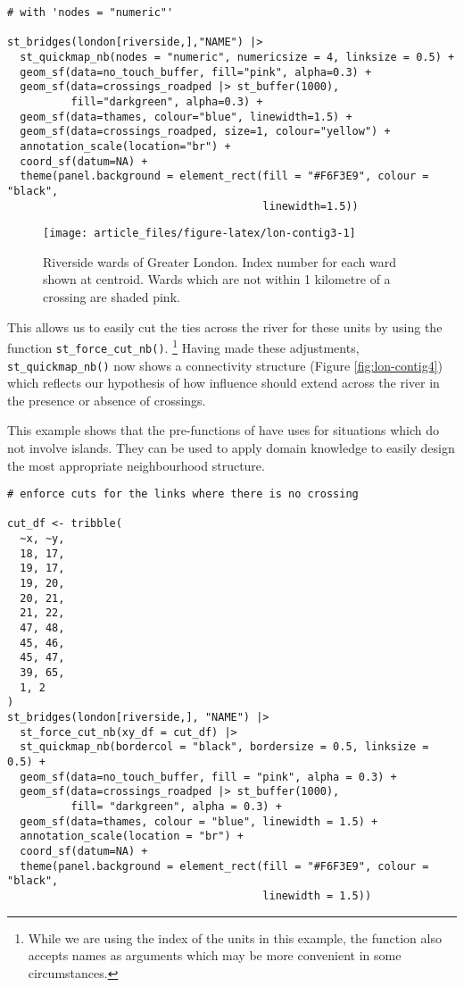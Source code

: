\begin{verbatim}
# with 'nodes = "numeric"'

st_bridges(london[riverside,],"NAME") |>
  st_quickmap_nb(nodes = "numeric", numericsize = 4, linksize = 0.5) +
  geom_sf(data=no_touch_buffer, fill="pink", alpha=0.3) +
  geom_sf(data=crossings_roadped |> st_buffer(1000),
          fill="darkgreen", alpha=0.3) +
  geom_sf(data=thames, colour="blue", linewidth=1.5) +
  geom_sf(data=crossings_roadped, size=1, colour="yellow") +
  annotation_scale(location="br") +
  coord_sf(datum=NA) +
  theme(panel.background = element_rect(fill = "#F6F3E9", colour = "black",
                                        linewidth=1.5))
\end{verbatim}

\begin{figure}

{\centering \texttt{[image: article\_files/figure-latex/lon-contig3-1]} 

}

\caption{Riverside wards of Greater London. Index number for each ward shown at centroid. Wards which are not within 1 kilometre of a crossing are shaded pink. }\label{fig:lon-contig3}
\end{figure}

This allows us to easily cut the ties across the river for these units by using the function \texttt{st\_force\_cut\_nb()}. \footnote{While we are using the index of the units in this example, the function also
  accepts names as arguments which may be more convenient in some circumstances.} Having made these adjustments,
\texttt{st\_quickmap\_nb()} now shows a connectivity structure (Figure \ref{fig:lon-contig4}) which reflects our hypothesis of how influence should extend across the river in the presence or absence of crossings.

This example shows that the pre-functions of  have uses for situations which do not involve islands. They can be used to apply domain knowledge to easily design the most appropriate neighbourhood structure.

\begin{verbatim}
# enforce cuts for the links where there is no crossing

cut_df <- tribble(
  ~x, ~y,
  18, 17,
  19, 17,
  19, 20,
  20, 21,
  21, 22,
  47, 48,
  45, 46,
  45, 47,
  39, 65,
  1, 2
)
st_bridges(london[riverside,], "NAME") |>
  st_force_cut_nb(xy_df = cut_df) |>
  st_quickmap_nb(bordercol = "black", bordersize = 0.5, linksize = 0.5) +
  geom_sf(data=no_touch_buffer, fill = "pink", alpha = 0.3) +
  geom_sf(data=crossings_roadped |> st_buffer(1000),
          fill= "darkgreen", alpha = 0.3) +
  geom_sf(data=thames, colour = "blue", linewidth = 1.5) +
  annotation_scale(location = "br") +
  coord_sf(datum=NA) +
  theme(panel.background = element_rect(fill = "#F6F3E9", colour = "black",
                                        linewidth = 1.5))
\end{verbatim}

